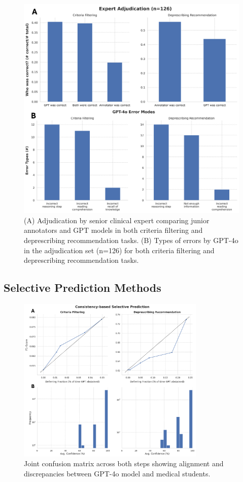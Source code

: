 \begin{figure}[!htbp]
	\centering
	\includegraphics[width=1\textwidth] {figures/aim1/adjudication_error_types_combined.png}
	\caption{(A) Adjudication by senior clinical expert comparing junior annotators and GPT models in both criteria filtering and deprescribing recommendation tasks. (B) Types of errors by GPT-4o in the adjudication set (n=126) for both criteria filtering and deprescribing recommendation tasks.} \label{fig:aim1-error-modes}
\end{figure}


\subsection{Selective Prediction Methods}


\begin{figure}[!htbp]
	\centering
	\includegraphics[width=0.8\textwidth] {figures/aim1/selective_pred_consistconf_with_dists.png}
	\caption{Joint confusion matrix across both steps showing alignment and discrepancies between GPT-4o model and medical students.} \label{fig:aim1-selective-pred}
\end{figure}


